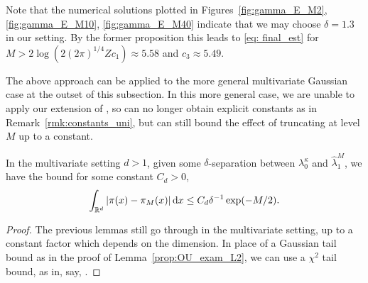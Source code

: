 \documentclass{aptpub}
\newcommand{\Rd}{\mathbb R^d}
\newcommand{\lkap}{\lambda_0^\kappa}
\begin{document}
\begin{remark}
 Note that the numerical solutions plotted in Figures~\ref{fig:gamma_E_M2}, \ref{fig:gamma_E_M10}, \ref{fig:gamma_E_M40} indicate that we may choose $\delta = 1.3$ in our setting. By the former proposition this leads to \eqref{eq: final_est} for
 $M>2 \log\left(2(2\pi)^{1/4} Zc_1\right)\approx 5.58$ and $c_3 \approx 5.49 $.
 \label{rmk:constants_uni}
\end{remark}

The above approach can be applied to the more general multivariate Gaussian case at the outset of this subsection. In this more general case, we are unable to apply our extension of \cite{Mielnik1996}, so can no longer obtain explicit constants as in Remark~\ref{rmk:constants_uni}, but can still bound the effect of truncating at level $M$ up to a constant.
\begin{proposition}\label{prop:multivar_trunc}
    In the multivariate setting $d>1$, given some $\delta$-separation between $\lkap$ and $\widehat \lambda_1^M$, we have the bound for some constant $C_d>0$,
    \begin{equation*}
        \int_{\Rd}|\pi(x) - \pi_M(x)| \dif x \le C_d \delta^{-1} \exp(-M/2).
    \end{equation*}
\end{proposition}
\begin{proof}
    The previous lemmas still go through in the multivariate setting, up to a constant factor which depends on the dimension. In place of a Gaussian tail bound as in the proof of Lemma~\ref{prop:OU_exam_L2}, we can use a $\chi^2$ tail bound, as in, say, \cite[Lemma 1]{Laurent2000}.
\end{proof}


\appendix

\end{document}
